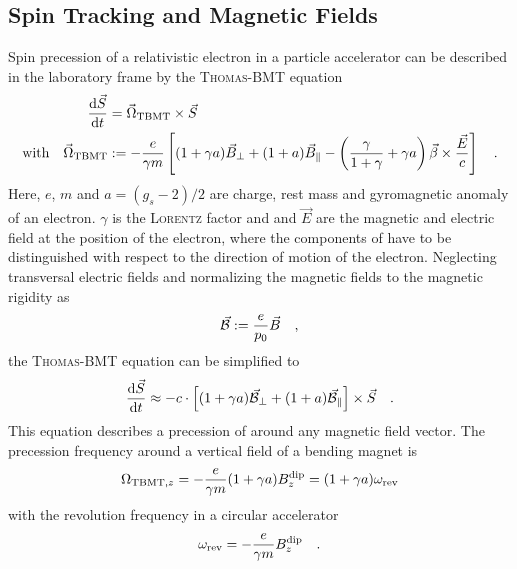 \documentclass[a4paper]{scrartcl}
\begin{document}
\subsection{Spin Tracking and Magnetic Fields}
\label{sec:concept-spin-tracking}
Spin precession of a relativistic electron in a particle accelerator can be described in
the laboratory frame by the
\textsc{Thomas-BMT} equation \cite{thomas,bmt}
\begin{align}
  \nonumber
  \frac{\text{d} \vec{S}_{}}{\text{d} t} &= \vec\Omega_\text{TBMT}\times\vec{S}_{}\\
  \label{eq:tbmt}
  \text{with}\quad
  \vec\Omega_\text{TBMT} &:= - \frac{e}{\gamma m} \left[ (1+\gamma a)\vec{B}_\bot + (1+a)\vec{B}_\parallel
    - \left(\frac{\gamma}{1+\gamma} +\gamma a\right)\vec\beta\times\frac{\vec E}{c} \right] \quad.
\end{align}
Here, $e$, $m$ and $a=(g_s-2)/2$ are charge, rest mass and gyromagnetic anomaly of an
electron. 
$\gamma$ is the \textsc{Lorentz} factor and \bvec and $\vec E$ are the magnetic and
electric  field at the position of the electron, where the components of \bvec have to be
distinguished with respect to the direction of motion of the electron.
%
Neglecting transversal electric fields and normalizing the magnetic fields to the magnetic
rigidity as
\begin{equation}
\label{eq:Bn}
  \vec{\mathcal{B}}_{} := \frac{e}{p_0} \vec{B} \quad,
\end{equation}
the \textsc{Thomas-BMT} equation can be simplified to
\begin{equation}
  \label{eq:tbmt-short}
  \frac{\text{d} \vec{S}_{}}{\text{d} t} \approx - c\cdot \left[ (1+\gamma a)\vec{\mathcal{B}}_{\bot} + (1+a)\vec{\mathcal{B}}_{\parallel} \right]
  \times\vec{S}_{} \quad.
\end{equation}
%
This equation describes a precession of \svec around any magnetic field vector. The precession
frequency around a vertical field \bdip of a bending magnet is
\begin{equation}
  \label{eq:omegaDip}
  \Omega_{\text{TBMT}, z} = - \frac{e}{\gamma m} (1+\gamma a) B_z^\text{dip} = (1+\gamma a) \omega_\text{rev}
\end{equation}
with the revolution frequency in a circular accelerator
\begin{equation*}
  \omega_\text{rev} = - \frac{e}{\gamma m} B_z^\text{dip} \quad.
\end{equation*}
\end{document}
